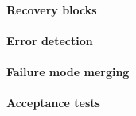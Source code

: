 \paragraph{Recovery blocks}

\paragraph{Error detection}

\paragraph{Failure mode merging}

\paragraph{Acceptance tests}
